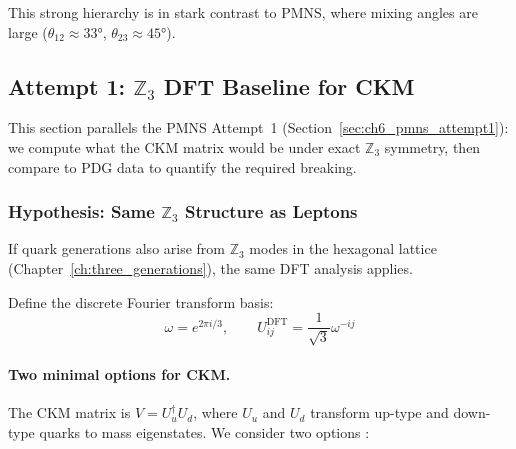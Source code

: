 This strong hierarchy is in stark contrast to PMNS, where mixing angles are large
($\theta_{12} \approx 33°$, $\theta_{23} \approx 45°$).

\subsection{\texorpdfstring{Attempt 1: $\mathbb{Z}_3$ DFT Baseline for CKM}{Attempt 1: Z3 DFT Baseline for CKM}}
\label{sec:ch7_dft_baseline}

This section parallels the PMNS Attempt~1 (Section~\ref{sec:ch6_pmns_attempt1}):
we compute what the CKM matrix would be under exact $\mathbb{Z}_3$ symmetry,
then compare to PDG data to quantify the required breaking.

\subsubsection{Hypothesis: Same $\mathbb{Z}_3$ Structure as Leptons}

If quark generations also arise from $\mathbb{Z}_3$ modes in the hexagonal
lattice (Chapter~\ref{ch:three_generations}), the same DFT analysis applies.

Define the discrete Fourier transform basis:
\begin{equation}
    \omega = e^{2\pi i/3}, \qquad
    U_{ij}^{\text{DFT}} = \frac{1}{\sqrt{3}} \omega^{-ij}
    \label{eq:ch7_dft_def}
\end{equation}

\paragraph{Two minimal options for CKM.}
The CKM matrix is $V = U_u^\dagger U_d$, where $U_u$ and $U_d$ transform
up-type and down-type quarks to mass eigenstates. We consider two options
\tagP{}:

